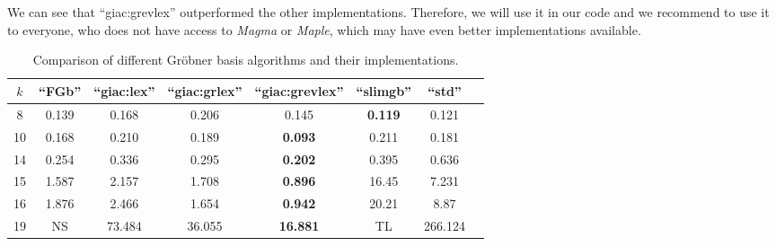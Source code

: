 \documentclass[thesis=M,english]{FITthesis}[2012/10/20]
\theoremstyle{remark}
\theoremstyle{definition}
\begin{document}
\\ \\
\noindent We can see that \enquote{giac:grevlex} outperformed the other implementations. Therefore, we will use it in our code and we recommend to use it to everyone, who does not have access to \textit{Magma} or \textit{Maple}, which may have even better implementations available. 
\begin{table}[H]
\centering
\begin{tabular}{ |c||c|c|c|c|c|c|c| } 
 \hline
$k$ & \enquote{FGb} & \enquote{giac:lex} & \enquote{giac:grlex} & \enquote{giac:grevlex} & \enquote{slimgb} & \enquote{std} \\ 
 \hline
 \hline
 8 & 0.139 & 0.168 &  0.206 & 0.145 & \textbf{0.119} & 0.121 \\ \hline
10 & 0.168 & 0.210 & 0.189 & \textbf{0.093} & 0.211 & 0.181\\ \hline 
14 & 0.254 & 0.336 & 0.295 & \textbf{0.202} & 0.395 &  0.636 \\ \hline
15 & 1.587 & 2.157 & 1.708 & \textbf{0.896} & 16.45 & 7.231 \\ \hline
16 & 1.876 & 2.466 & 1.654 & \textbf{0.942} & 20.21&  8.87 \\ \hline
19 &  NS & 73.484 & 36.055 & \textbf{16.881} & TL & 266.124  \\ \hline
\end{tabular}
\caption[Comparison of different Gröbner basis algorithms]{Comparison of different Gröbner basis algorithms and their implementations.}
\label{gbComp}
\end{table}
\end{document}
